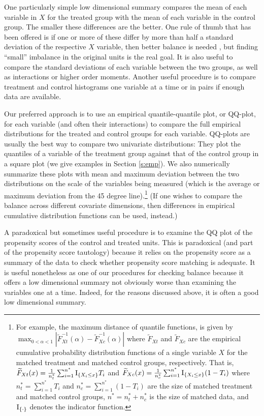 \documentclass[11pt,titlepage]{article}
\begin{document}
One particularly simple low dimensional summary compares the mean of
each variable in $X$ for the treated group with the mean of each
variable in the control group.  The smaller these differences are the
better.  One rule of thumb that has been offered is if one or more of
these differ by more than half a standard deviation of the respective
$X$ variable, then better balance is needed \citep{Cochran68}, but
finding ``small'' imbalance in the original units is the real goal.
It is also useful to compare the standard deviations of each variable
between the two groups, as well as interactions or higher order
moments.  Another useful procedure is to compare treatment and control
histograms one variable at a time or in pairs if enough data are
available.

Our preferred approach is to use an empirical quantile-quantile plot,
or QQ-plot, for each variable (and often their interactions) to
compare the full empirical distributions for the treated and control
groups for each variable.  QQ-plots are usually the best way to
compare two univariate distributions: They plot the quantiles of a
variable of the treatment group against that of the control group in a
square plot (we give examples in Section \ref{s:emp}).  We also
numerically summarize these plots with mean and maximum deviation
between the two distributions on the scale of the variables being
measured (which is the average or maximum deviation from the 45 degree
line).\footnote{For example, the maximum distance of quantile
  functions, is given by $\max_{0 < \alpha < 1}
  |\widetilde{F}_{Xt}^{-1}(\alpha)-\widetilde{F}^{-1}_{Xc}(\alpha)|$
  where $\widetilde{F}_{Xt}$ and $\widetilde{F}_{Xc}$ are the
  empirical cumulative probability distribution functions of a single
  variable $X$ for the matched treatment and matched control groups,
  respectively. That is, $\widetilde{F}_{Xt}(x)=\frac{1}{n^*_t}
  \sum_{i=1}^{n^*} {\rm I}_{\{X_i \le x\}} T_i$ and
  $\widetilde{F}_{Xc}(x)=\frac{1}{n^*_c} \sum_{i=1}^{n^*} {\rm
    I}_{\{X_i \le x\}} (1-T_i)$ where $n^*_t=\sum_{i=1}^{n^*} T_i$ and
  $n^*_c=\sum_{i=1}^{n^*} (1-T_i)$ are the size of matched treatment
  and matched control groups, $n^*=n^*_t + n^*_c$ is the size of
  matched data, and ${\rm I}_{\{\cdot\}}$ denotes the indicator
  function.} (If one wishes to compare the balance across different
covariate dimensions, then differences in empirical cumulative
distribution functions can be used, instead.)

A paradoxical but sometimes useful procedure is to examine the QQ plot
of the propensity scores of the control and treated units.  This is
paradoxical (and part of the propensity score tautology) because it
relies on the propensity score as a summary of the data to check
whether propensity score matching is adequate.  It is useful
nonetheless as one of our procedures for checking balance because it
offers a low dimensional summary not obviously worse than 
examining the variables one at a time.  Indeed, for the reasons discussed
above, it is often a good low dimensional summary.
\end{document}

